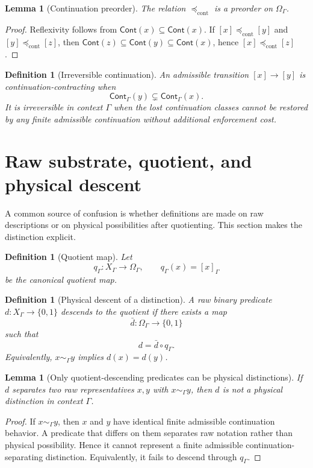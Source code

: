 \documentclass[11pt]{article}
\newtheorem{lemma}[theorem]{Lemma}
\newtheorem{definition}[theorem]{Definition}
\newcommand{\Cont}{\mathsf{Cont}}
\newcommand{\preceqcont}{\preceq_{\mathrm{cont}}}
\begin{document}
\begin{lemma}[Continuation preorder]
The relation $\preceqcont$ is a preorder on $\Omega_\Gamma$.
\end{lemma}
\begin{proof}
Reflexivity follows from $\Cont(x)\subseteq\Cont(x)$.  If $[x]\preceqcont[y]$ and $[y]\preceqcont[z]$, then $\Cont(z)\subseteq\Cont(y)\subseteq\Cont(x)$, hence $[x]\preceqcont[z]$.
\end{proof}

\begin{definition}[Irreversible continuation]
An admissible transition $[x]\to[y]$ is \emph{continuation-contracting} when
\[
\Cont_\Gamma(y)\subsetneq\Cont_\Gamma(x).
\]
It is \emph{irreversible in context $\Gamma$} when the lost continuation classes cannot be restored by any finite admissible continuation without additional enforcement cost.
\end{definition}

\section{Raw substrate, quotient, and physical descent}\label{sec:raw-quotient-descent}

A common source of confusion is whether definitions are made on raw descriptions or on physical possibilities after quotienting.  This section makes the distinction explicit.

\begin{definition}[Quotient map]
Let
\[
 q_\Gamma:X_\Gamma\to\Omega_\Gamma,
 \qquad q_\Gamma(x)=[x]_\Gamma
\]
be the canonical quotient map.
\end{definition}

\begin{definition}[Physical descent of a distinction]
A raw binary predicate $d:X_\Gamma\to\{0,1\}$ \emph{descends to the quotient} if there exists a map
\[
 \bar d:\Omega_\Gamma\to\{0,1\}
\]
such that
\[
 d=\bar d\circ q_\Gamma .
\]
Equivalently, $x\sim_\Gamma y$ implies $d(x)=d(y)$.
\end{definition}

\begin{lemma}[Only quotient-descending predicates can be physical distinctions]
If $d$ separates two raw representatives $x,y$ with $x\sim_\Gamma y$, then $d$ is not a physical distinction in context $\Gamma$.
\end{lemma}
\begin{proof}
If $x\sim_\Gamma y$, then $x$ and $y$ have identical finite admissible continuation behavior.  A predicate that differs on them separates raw notation rather than physical possibility.  Hence it cannot represent a finite admissible continuation-separating distinction.  Equivalently, it fails to descend through $q_\Gamma$.
\end{proof}
\end{document}
